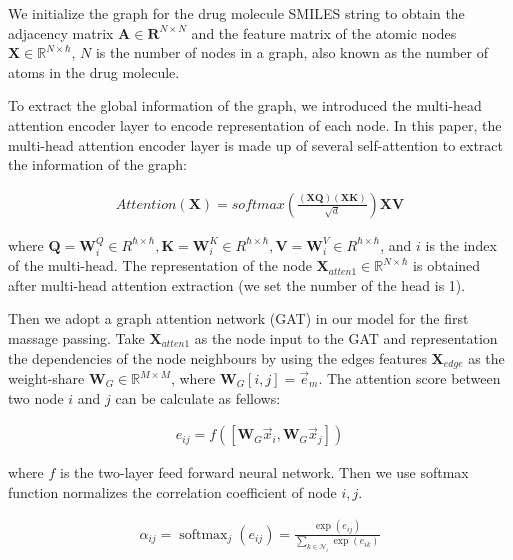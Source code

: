 \documentclass{article}
\begin{document}
We initialize the graph for the drug molecule SMILES string to obtain the adjacency matrix   $\mathbf{A} \in \mathbf{R}^{N\times N}$ and the feature matrix of the atomic nodes $\mathbf{X} \in \mathbb{R}^{N\times \hbar }$, $N$ is the number of nodes in a graph, also known as the number of atoms in the drug molecule.

To extract the global information of the graph, we introduced the multi-head attention encoder layer to encode representation of each node. In this paper, the multi-head attention encoder layer is made up of several self-attention to extract the  information of the graph: 








\begin{align}
      Attention(\mathbf{X}) = softmax(\frac{(\mathbf{XQ})(\mathbf{XK})}{\sqrt{d}})\mathbf{XV}
      \label{alg: attention}
\end{align}

\noindent where $\mathbf{Q}=\mathbf{W}_i^Q \in R^{\hbar \times \hbar}, \mathbf{K}=\mathbf{W}_i^K  \in R^{\hbar \times \hbar}, \mathbf{V}=\mathbf{W}_i^V  \in R^{\hbar \times \hbar}$, and $i$ is the index of the multi-head. The representation of the node $\mathbf{X}_{atten1} \in \mathbb{R}^{N\times \hbar}$ is obtained after multi-head attention extraction (we set the number of the head is 1).


Then we adopt a graph attention network (GAT) \cite{GAT} in our model for the first massage passing.
Take $\mathbf{X}_{atten1}$ as the node input to the GAT and representation the dependencies of the node neighbours by using the edges features $\mathbf{X}_{edge}$ as the  weight-share  $\mathbf{W}_{G} \in \mathbb{R}^{ M \times M }$, where $\mathbf{W}_{G} \left[i,j\right] = \vec{e}_m$. The attention score between two node $i$ and $j$ can be calculate as fellows:




\begin{align}
    e_{i j}=f\left( \left [ \mathbf{W}_{G} \vec{x}_{i}, \mathbf{W}_{G} \vec{x}_{j} \right ]
\right)
\end{align}

\noindent where $f$ is the two-layer feed forward neural network. Then  we use softmax function normalizes the correlation coefficient of node $i,j$.





\begin{align}
 \alpha_{i j}=\operatorname{softmax}_{j}\left(e_{i j}\right)=\frac{\exp \left(e_{i j}\right)}{\sum_{k \in \mathcal{N}_{i}} \exp \left(e_{i k}\right)}
\end{align}
\end{document}
